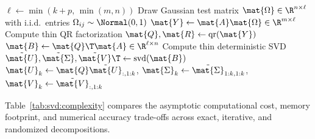 \documentclass[../../../../master.tex]{subfiles}
\begin{document}
\begin{algorithm}[htbp]
\caption{Randomized Truncated SVD with Power Subspace Iteration}
\label{alg:svd:rsvd}
$\ell \leftarrow \min(k + p,\, \min(m, n))$\;
Draw Gaussian test matrix $\mat{\Omega} \in \R^{n \times \ell}$ with i.i.d.\ entries $\Omega_{ij} \sim \Normal(0, 1)$\;
$\mat{Y} \leftarrow \mat{A}\mat{\Omega} \in \R^{m \times \ell}$ 
Compute thin QR factorization $\mat{Q}, \mat{R} \leftarrow \mathrm{qr}(\mat{Y})$ 
$\mat{B} \leftarrow \mat{Q}\T \mat{A} \in \R^{\ell \times n}$ 
Compute thin deterministic SVD $\tilde{\mat{U}}, \tilde{\mat{\Sigma}}, \tilde{\mat{V}}\T \leftarrow \mathrm{svd}(\mat{B})$ 
$\mat{U}_k \leftarrow \mat{Q}\tilde{\mat{U}}_{:, 1:k}$, \quad $\mat{\Sigma}_k \leftarrow \tilde{\mat{\Sigma}}_{1:k, 1:k}$, \quad $\mat{V}_k \leftarrow \tilde{\mat{V}}_{:, 1:k}$\;
\;
\end{algorithm}

Table~\ref{tab:svd:complexity} compares the asymptotic computational cost, memory footprint, and numerical accuracy trade-offs across exact, iterative, and randomized decompositions.
\end{document}
